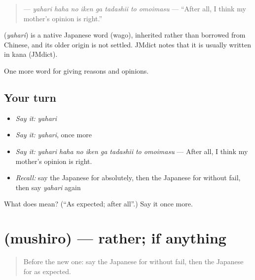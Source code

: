\begin{quote}
\textbf{    } — \emph{yahari haha no iken ga tadashii to omoimasu} — \textquotedblleft{}After all, I think my mother's opinion is right.\textquotedblright{}
\end{quote}

\begin{cousinweb}
\textbf{} (\emph{yahari}) is a native Japanese word (wago), inherited rather than borrowed from Chinese, and its older origin is not settled. JMdict notes that it is usually written in kana (JMdict).
\end{cousinweb}

\begin{grammarlens}[title={What you've built}]
One more word for giving reasons and opinions.
\end{grammarlens}

\subsection*{Your turn}
\begin{itemize}
\raggedright
  \item \emph{Say it:} \emph{yahari}
  \item \emph{Say it:} \emph{yahari}, once more
  \item \emph{Say it:} \emph{yahari haha no iken ga tadashii to omoimasu} — After all, I think my mother's opinion is right.
  \item \emph{Recall:} say the Japanese for absolutely, then the Japanese for without fail, then say \emph{yahari} again
\end{itemize}

\begin{tcolorbox}[breakable,colback=teal!4,colframe=teal!35!black,title={Before you move on}]
What does  mean? (\textquotedblleft{}As expected; after all\textquotedblright{}.) Say it once more.
\end{tcolorbox}
\section[\texorpdfstring{\ja{むしろ} (mushiro)}{むしろ (mushiro)}]{ (mushiro) — rather; if anything}

\label{lesson:JA-C321-mushiro}



\begin{quote}
Before the new one: say the Japanese for without fail, then the Japanese for as expected.
\end{quote}


